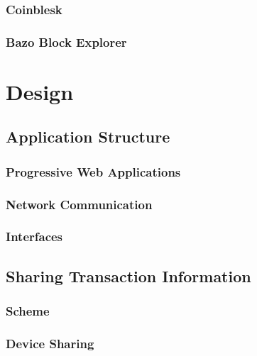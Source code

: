 \documentclass[a4paper]{article}
\begin{document}
\subsubsection{Coinblesk}
\subsubsection{Bazo Block Explorer}
\newpage


\section{Design}

\subsection{Application Structure}

\subsubsection{Progressive Web Applications}
\subsubsection{Network Communication}
\subsubsection{Interfaces}

\subsection{Sharing Transaction Information}
\subsubsection{Scheme}
\subsubsection{Device Sharing}
\end{document}
